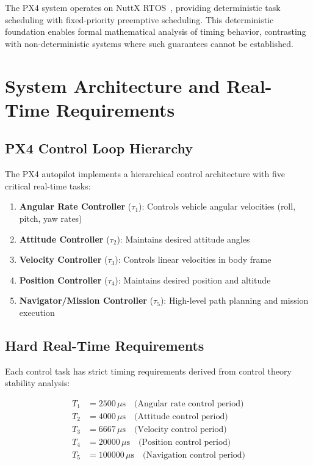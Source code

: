 \documentclass[11pt,a4paper]{article}
\theoremstyle{definition}
\theoremstyle{remark}
\begin{document}
The PX4 system operates on NuttX RTOS~\cite{nuttx}, providing deterministic task scheduling with fixed-priority preemptive scheduling. This deterministic foundation enables formal mathematical analysis of timing behavior, contrasting with non-deterministic systems where such guarantees cannot be established.

\section{System Architecture and Real-Time Requirements}

\subsection{PX4 Control Loop Hierarchy}

The PX4 autopilot implements a hierarchical control architecture with five critical real-time tasks:

\begin{enumerate}
\item \textbf{Angular Rate Controller} ($\tau_1$): Controls vehicle angular velocities (roll, pitch, yaw rates)
\item \textbf{Attitude Controller} ($\tau_2$): Maintains desired attitude angles
\item \textbf{Velocity Controller} ($\tau_3$): Controls linear velocities in body frame
\item \textbf{Position Controller} ($\tau_4$): Maintains desired position and altitude
\item \textbf{Navigator/Mission Controller} ($\tau_5$): High-level path planning and mission execution
\end{enumerate}

\subsection{Hard Real-Time Requirements}

Each control task has strict timing requirements derived from control theory stability analysis:

\begin{align}
T_1 &= 2500\,\mu\text{s} \quad \text{(Angular rate control period)} \\
T_2 &= 4000\,\mu\text{s} \quad \text{(Attitude control period)} \\
T_3 &= 6667\,\mu\text{s} \quad \text{(Velocity control period)} \\
T_4 &= 20000\,\mu\text{s} \quad \text{(Position control period)} \\
T_5 &= 100000\,\mu\text{s} \quad \text{(Navigation control period)}
\end{align}
\end{document}
